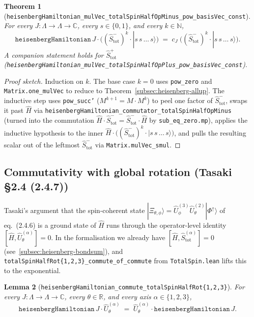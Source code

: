 \documentclass[a4paper,11pt]{article}
\newtheorem{theorem}{Theorem}
\newtheorem{lemma}[theorem]{Lemma}
\begin{document}
\begin{theorem}[\texttt{heisenbergHamiltonian\_mulVec\_totalSpinHalfOpMinus\_pow\_basisVec\_const}]
For every $J : \Lambda \to \Lambda \to \mathbb{C}$, every
$s \in \{0,1\}$, and every $k \in \mathbb{N}$,
\[
  \texttt{heisenbergHamiltonian}\,J \cdot
    \bigl((\hat S_{\mathrm{tot}}^{-})^{k} \cdot
            |s\,s\,\dots\,s\rangle\bigr)
  \;=\;
  c_{J}\;
    \bigl((\hat S_{\mathrm{tot}}^{-})^{k} \cdot
            |s\,s\,\dots\,s\rangle\bigr).
\]
A companion statement holds for $\hat S_{\mathrm{tot}}^{+}$
(\texttt{heisenbergHamiltonian\_mulVec\_totalSpinHalfOpPlus\_pow\_basisVec\_const}).
\end{theorem}

\begin{proof}[Proof sketch]
Induction on $k$. The base case $k=0$ uses
\texttt{pow\_zero} and \texttt{Matrix.one\_mulVec} to reduce to
Theorem~\ref{subsec:heisenberg-allup}. The inductive step uses
\texttt{pow\_succ'}
($M^{k+1} = M\cdot M^{k}$) to peel one factor of
$\hat S_{\mathrm{tot}}^{-}$, swaps it past $\hat H$ via
\texttt{heisenbergHamiltonian\_commutator\_totalSpinHalfOpMinus} (turned
into the commutation $\hat H\cdot\hat S_{\mathrm{tot}}^{-}
=\hat S_{\mathrm{tot}}^{-}\cdot\hat H$ by
\texttt{sub\_eq\_zero.mp}), applies the inductive hypothesis to the
inner $\hat H \cdot \bigl((\hat S_{\mathrm{tot}}^{-})^{k}\cdot
|s\,s\,\dots\,s\rangle\bigr)$, and pulls the resulting scalar out of
the leftmost $\hat S_{\mathrm{tot}}^{-}$ via
\texttt{Matrix.mulVec\_smul}.
\end{proof}

\subsection{Commutativity with global rotation (Tasaki §2.4 (2.4.7))}
\label{subsec:heisenberg-rot-commute}

Tasaki's argument that the spin-coherent state
$|\Xi_{\theta,\phi}\rangle = \hat U^{(3)}_{\phi}\hat U^{(2)}_{\theta}
|\Phi^{\uparrow}\rangle$ of eq.~(2.4.6) is a ground state of $\hat H$
runs through the operator-level identity
$[\hat H, \hat U^{(\alpha)}_{\theta}] = 0$.  In the formalisation we
already have $[\hat H, \hat S_{\mathrm{tot}}^{(\alpha)}] = 0$
(see~\ref{subsec:heisenberg-bondsum}), and
\texttt{totalSpinHalfRot\{1,2,3\}\_commute\_of\_commute} from
\texttt{TotalSpin.lean} lifts this to the exponential.

\begin{lemma}[\texttt{heisenbergHamiltonian\_commute\_totalSpinHalfRot\{1,2,3\}}]
For every $J : \Lambda \to \Lambda \to \mathbb{C}$, every $\theta \in
\mathbb{R}$, and every axis $\alpha \in \{1,2,3\}$,
\[
  \texttt{heisenbergHamiltonian}\,J \cdot
    \hat U^{(\alpha)}_{\theta}
  \;=\;
  \hat U^{(\alpha)}_{\theta} \cdot
    \texttt{heisenbergHamiltonian}\,J.
\]
\end{lemma}
\end{document}
